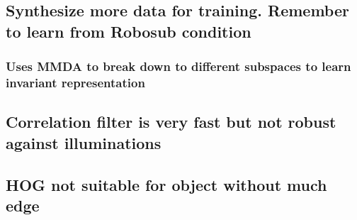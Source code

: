 \documentclass[11pt]{article}
\begin{document}
\subsection{Synthesize more data for training. Remember to learn from Robosub condition}
\label{sec:org7876ab2}
\subsubsection{Uses MMDA to break down to different subspaces to learn invariant representation}
\label{sec:orgcc43c53}
\subsection{Correlation filter is very fast but not robust against illuminations}
\label{sec:org992ed90}
\subsection{HOG not suitable for object without much edge}
\label{sec:org8ae7980}
\end{document}
